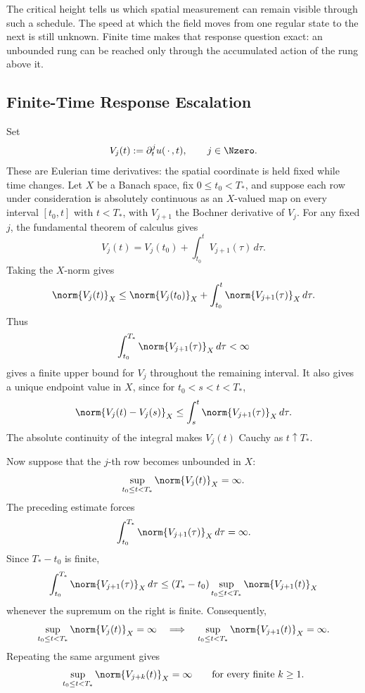The critical height tells us which spatial measurement can remain visible through such a schedule.
The speed at which the field moves from one regular state to the next is still unknown.
Finite time makes that response question exact: an unbounded rung can be reached only through the accumulated action of the rung above it.


\subsection{Finite-Time Response Escalation}\label{sub:FiniteTimeResponseEscalation}

Set
\[
  V_j(t)
  :=
  \partial_t^j u(\,\cdot\,,t),
  \qquad
  j\in\Nzero.
\]
These are Eulerian time derivatives: the spatial coordinate is held fixed while time changes.
Let \(X\) be a Banach space, fix \(0\leq t_0<T_*\), and suppose each row under consideration is absolutely continuous as an \(X\)-valued map on every interval \([t_0,t]\) with \(t<T_*\), with \(V_{j+1}\) the Bochner derivative of \(V_j\).
For any fixed \(j\), the fundamental theorem of calculus gives
\[
  V_j(t)
  =
  V_j(t_0)
  +
  \int_{t_0}^{t}V_{j+1}(\tau)\,d\tau.
\]
Taking the \(X\)-norm gives
\[
  \norm{V_j(t)}_X
  \leq
  \norm{V_j(t_0)}_X
  +
  \int_{t_0}^{t}\norm{V_{j+1}(\tau)}_X\,d\tau.
\]
Thus
\[
  \int_{t_0}^{T_*}\norm{V_{j+1}(\tau)}_X\,d\tau
  <
  \infty
\]
gives a finite upper bound for \(V_j\) throughout the remaining interval.
It also gives a unique endpoint value in \(X\), since for \(t_0<s<t<T_*\),
\[
  \norm{V_j(t)-V_j(s)}_X
  \leq
  \int_s^t\norm{V_{j+1}(\tau)}_X\,d\tau.
\]
The absolute continuity of the integral makes \(V_j(t)\) Cauchy as \(t\uparrow T_*\).

Now suppose that the \(j\)-th row becomes unbounded in \(X\):
\[
  \sup_{t_0\leq t<T_*}
  \norm{V_j(t)}_X
  =
  \infty.
\]
The preceding estimate forces
\[
  \int_{t_0}^{T_*}
  \norm{V_{j+1}(\tau)}_X
  \,d\tau
  =
  \infty.
\]
Since \(T_*-t_0\) is finite,
\[
  \int_{t_0}^{T_*}
  \norm{V_{j+1}(\tau)}_X
  \,d\tau
  \leq
  (T_*-t_0)
  \sup_{t_0\leq t<T_*}
  \norm{V_{j+1}(t)}_X
\]
whenever the supremum on the right is finite.
Consequently,
\[
  \sup_{t_0\leq t<T_*}
  \norm{V_j(t)}_X
  =
  \infty
  \quad\Longrightarrow\quad
  \sup_{t_0\leq t<T_*}
  \norm{V_{j+1}(t)}_X
  =
  \infty.
\]
Repeating the same argument gives
\[
  \sup_{t_0\leq t<T_*}
  \norm{V_{j+k}(t)}_X
  =
  \infty
  \qquad
  \text{for every finite }k\geq1.
\]

